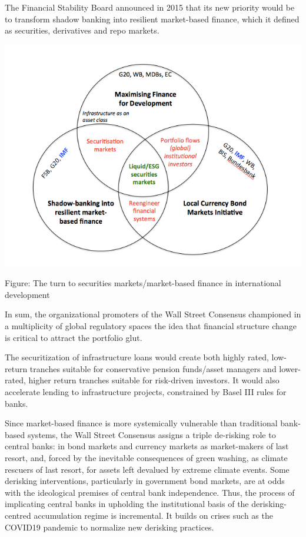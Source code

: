 \documentclass[
]{book}
\begin{document}
The Financial Stability Board announced in 2015 that its new priority would be to transform
shadow banking into resilient market-based finance, which it defined as securities,
derivatives and repo markets.

\includegraphics{fig/new_development_finance.png}

Figure: The turn to securities markets/market-based finance in international development

In sum, the organizational promoters of the Wall Street
Consensus championed in a multiplicity of global regulatory spaces the idea that
financial structure change is critical to attract the portfolio glut.

The
securitization of infrastructure loans would create both highly rated, low-return
tranches suitable for conservative pension funds/asset managers and lower-rated,
higher return tranches suitable for risk-driven investors. It would also accelerate lending
to infrastructure projects, constrained by Basel III rules for banks.

Since market-based finance is more systemically vulnerable than traditional bank-based
systems, the Wall Street Consensus assigns a triple de-risking role to central banks: in
bond markets and currency markets as market-makers of last resort,
and, forced by the inevitable consequences of green washing, as climate rescuers of last
resort, for assets left devalued by extreme climate events.
Some derisking
interventions, particularly in government bond markets, are at odds with the ideological
premises of central bank independence. Thus, the process of implicating central banks
in upholding the institutional basis of the derisking-centred accumulation regime is
incremental. It builds on crises such as the COVID19 pandemic to normalize new
derisking practices.
\end{document}
